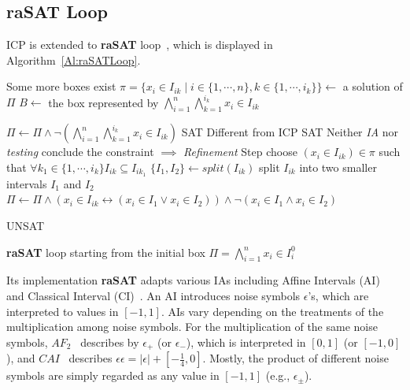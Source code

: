 \documentclass[runningheads,a4paper,oribibl]{llncs}
\begin{document}
\subsection{raSAT Loop}
ICP is extended to {\bf raSAT} loop~\cite{VanKhanh201227}, 
which is displayed in Algorithm~\ref{Al:raSATLoop}.  
\begin{algorithm}[h]
\begin{algorithmic}[1]
 \Comment Some more boxes exist
\State $\pi = \{x_i \in I_{ik} \mid i \in \{1,\cdots, n\}, k \in \{1,\cdots, i_k\} \} \gets $
a solution of $\Pi$ 	
\State $B \gets $ the box represented by
$\bigwedge\limits_{i=1}^n\bigwedge\limits_{k=1}^{i_k}x_i \in I_{ik}$

\State $\Pi \gets \Pi \wedge \neg(\bigwedge\limits_{i=1}^n\bigwedge\limits_{k=1}^{i_k}x_i \in I_{ik})$
\State \Return SAT
   \Comment Different from ICP
\State \Return SAT
\Else \Comment Neither \emph{IA} nor \emph{testing} conclude the constraint $\implies$
\emph{Refinement} Step
\State choose $(x_i \in I_{ik}) \in \pi$ such that $\forall k_1 \in \{1,\cdots, i_k\} I_{ik} \subseteq I_{ik_1}$
\State $\{I_1, I_2\} \gets split(I_{ik})$ \Comment split $I_{ik}$
into two smaller intervals $I_1$ and $I_2$
\State $\Pi \gets \Pi \wedge (x_i \in I_{ik} \leftrightarrow (x_i \in I_1 \vee x_i \in I_2))
\wedge \neg(x_i \in I_1 \wedge x_i \in I_2)$

\EndIf
\EndWhile
\State \Return UNSAT
\end{algorithmic}
\caption{\textbf{raSAT} loop starting from the initial box
  $\Pi = \bigwedge\limits_{i=1}^n x_i \in I_i^0$}
\label{Al:raSATLoop}
\end{algorithm}
%

Its implementation {\bf raSAT} adapts various IAs including Affine Intervals
(AI)~\cite{Comba93affinearithmetic,Ngoc:2009:ORE:1685167.1685421,VanKhanh201227}
and Classical Interval (CI)~\cite{moore}.
An AI introduces noise symbols $\epsilon$'s, which are interpreted to values in $[-1,1]$. 
AIs vary depending on the treatments of the multiplication among noise symbols.
For the multiplication of the same noise symbols, $AF_2$~\cite{Messine_extensionsof}
describes by $\epsilon_+$ (or $\epsilon_{-}$), which is interpreted in $[0,1]$ (or $[-1,0]$),
and $CAI$~\cite{VanKhanh201227} describes
$\epsilon \epsilon = |\epsilon| + [-\frac{1}{4}, 0]$. 
Mostly, the product of different noise symbols are simply regarded as any value in $[-1,1]$
(e.g., $\epsilon_{\pm}$). 
\end{document}
